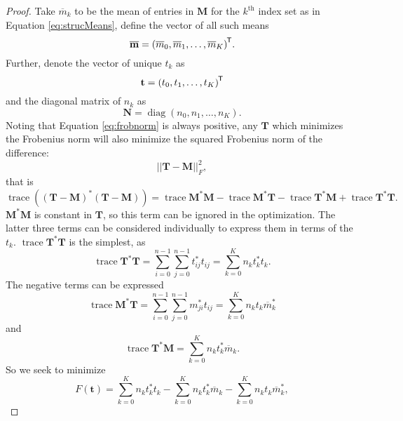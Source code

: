 \documentclass[letterpaper,12pt,oneside,final]{article}
\newcommand{\ve}[1]{\mathbf{#1}}           %
\newcommand{\m}[1]{\mathbf{#1}}               %
\newcommand{\tr}[1]{{#1}^{\mkern-1.5mu\mathsf{T}}}              %
\newcommand{\conj}[1]{{#1}^{\ast}}
\newcommand{\norm}[1]{||{#1}||}              %
\newcommand{\frob}[1]{\norm{#1}_F}
\newcommand*{\trace}{\operatorname{trace}}
\newcommand*{\diag}{\operatorname{diag}}
\newcommand{\widebar}[1]{\overline{#1}}
\begin{document}
\begin{proof}
   Take $\widebar{m}_k$ to be the mean of entries in $\m{M}$ for the $k^{\text{th}}$ index set as in Equation \ref{eq:strucMeans}, define the vector of all such means
  \begin{equation*}
    \widebar{ \ve{m} } = \tr{ (\widebar{m}_0, \widebar{m}_1, \dots, \widebar{m}_K) }.
  \end{equation*}
  Further, denote the vector of unique $t_k$ as
  \begin{equation*}
    \ve{t} = \tr{ ( t_0, t_1, \dots, t_K ) }
  \end{equation*}
  and the diagonal matrix of $n_k$ as
  \begin{equation*}
    \m{N} = \diag (n_0, n_1, \dots, n_K).
  \end{equation*}
  Noting that Equation \ref{eq:frobnorm} is always positive, any $\m{T}$ which minimizes the Frobenius norm will also minimize the squared Frobenius norm of the difference:
  $$\frob{\m{T} - \m{M}}^2,$$
  that is
  \begin{equation} \label{eq:ToBeOptimized}
    \trace \left ( \conj{(\m{T} - \m{M})}(\m{T} - \m{M}) \right ) = \trace \conj{\m{M}} \m{M} - \trace \conj{\m{M}} \m{T} - \trace \conj{\m{T}} \m{M} + \trace \conj{\m{T}} \m{T}.
  \end{equation}
  $\conj{\m{M}} \m{M}$ is constant in $\m{T}$, so this term can be ignored in the optimization. The latter three terms can be considered individually to express them in terms of the $t_k$. $\trace \conj{\m{T}} \m{T}$ is the simplest, as
  \begin{equation} \label{eq:Tsquared}
    \trace \conj{\m{T}} \m{T} = \sum_{i = 0}^{n-1} \sum_{j = 0}^{n-1} \conj{t}_{ij} t_{ij} = \sum_{k = 0}^{K} n_k \conj{t}_k t_k.
  \end{equation}
  The negative terms can be expressed
  \begin{equation} \label{eq:conjMT}
    \trace \conj{\m{M}} \m{T} = \sum_{i = 0}^{n-1} \sum_{j = 0}^{n-1} \conj{m}_{ji} t_{ij} = \sum_{k = 0}^{K} n_k t_k \conj{ \widebar{m} }_k 
  \end{equation}
  and
  \begin{equation} \label{eq:conjTM}
    \trace \conj{\m{T}} \m{M} = \sum_{k = 0}^{K} n_k \conj{t}_k \widebar{m}_k.
  \end{equation}
  So we seek to minimize
  \begin{equation*}
    F(\ve{t}) = \sum_{k = 0}^{K} n_k \conj{t}_k t_k - \sum_{k = 0}^{K} n_k \conj{t}_k \widebar{m}_k - \sum_{k = 0}^{K} n_k t_k \conj{ \widebar{m} }_k,

\end{equation*}
\end{proof}
\end{document}
